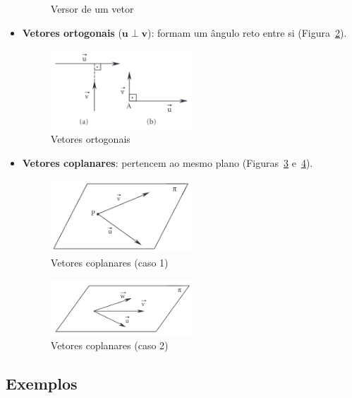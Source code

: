 \begin{itemize}
\begin{figure}[H]
        \caption{Versor de um vetor}\label{fig:fig1.8}
    \end{figure}
    \item \textbf{Vetores ortogonais} ($\mathbf{u} \perp \mathbf{v}$): formam um
    ângulo reto entre si (Figura~\ref{fig:fig1.9}).
    \begin{figure}[H]
        \centering
        \includegraphics[width=0.5\textwidth]{./fig/fig1.9.png}
        \caption{Vetores ortogonais}\label{fig:fig1.9}
    \end{figure}
    \item \textbf{Vetores coplanares}: pertencem ao mesmo plano
      (Figuras~\ref{fig:fig1.10} e~\ref{fig:fig1.11}).
    \begin{figure}[H]
        \centering
        \includegraphics[width=0.5\textwidth]{./fig/fig1.10.png}
        \caption{Vetores coplanares (caso 1)}\label{fig:fig1.10}
    \end{figure}
    
    \begin{figure}[H]
        \centering
        \includegraphics[width=0.5\textwidth]{./fig/fig1.11.png}
        \caption{Vetores coplanares (caso 2)}\label{fig:fig1.11}
    \end{figure}
\end{itemize}

\newpage

\subsection{Exemplos}

